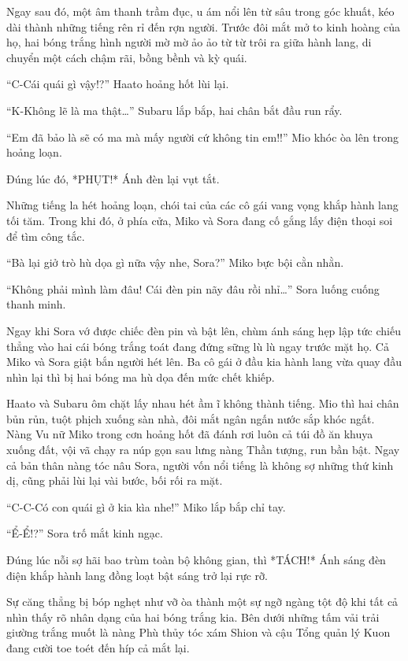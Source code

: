 \documentclass[../main.tex]{subfiles}
\begin{document}
Ngay sau đó, một âm thanh trầm đục, u ám nổi lên từ sâu trong góc khuất, kéo dài thành những tiếng rên rỉ đến rợn người. Trước đôi mắt mở to kinh hoàng của họ, hai bóng trắng hình người mờ mờ ảo ảo từ từ trôi ra giữa hành lang, di chuyển một cách chậm rãi, bồng bềnh và kỳ quái.

``C-Cái quái gì vậy!?'' Haato hoảng hốt lùi lại.

``K-Không lẽ là ma thật\dots'' Subaru lắp bắp, hai chân bắt đầu run rẩy.

``Em đã bảo là sẽ có ma mà mấy người cứ không tin em!!'' Mio khóc òa lên trong hoảng loạn.

Đúng lúc đó, *PHỤT!* Ánh đèn lại vụt tắt.

Những tiếng la hét hoảng loạn, chói tai của các cô gái vang vọng khắp hành lang tối tăm. Trong khi đó, ở phía cửa, Miko và Sora đang cố gắng lấy điện thoại soi để tìm công tắc.

``Bà lại giở trò hù dọa gì nữa vậy nhe, Sora?'' Miko bực bội cằn nhằn.

``Không phải mình làm đâu! Cái đèn pin nãy đâu rồi nhỉ\dots'' Sora luống cuống thanh minh.

Ngay khi Sora vớ được chiếc đèn pin và bật lên, chùm ánh sáng hẹp lập tức chiếu thẳng vào hai cái bóng trắng toát đang đứng sững lù lù ngay trước mặt họ. Cả Miko và Sora giật bắn người hét lên. Ba cô gái ở đầu kia hành lang vừa quay đầu nhìn lại thì bị hai bóng ma hù dọa đến mức chết khiếp.

Haato và Subaru ôm chặt lấy nhau hét ầm ĩ không thành tiếng. Mio thì hai chân bủn rủn, tuột phịch xuống sàn nhà, đôi mắt ngân ngấn nước sắp khóc ngất. Nàng Vu nữ Miko trong cơn hoảng hốt đã đánh rơi luôn cả túi đồ ăn khuya xuống đất, vội vã chạy ra núp gọn sau lưng nàng Thần tượng, run bần bật. Ngay cả bản thân nàng tóc nâu Sora, người vốn nổi tiếng là không sợ những thứ kinh dị, cũng phải lùi lại vài bước, bối rối ra mặt.

``C-C-Có con quái gì ở kia kìa nhe!'' Miko lắp bắp chỉ tay.

``Ể-Ể!?'' Sora trố mắt kinh ngạc.

Đúng lúc nỗi sợ hãi bao trùm toàn bộ không gian, thì *TÁCH!* Ánh sáng đèn điện khắp hành lang đồng loạt bật sáng trở lại rực rỡ.

Sự căng thẳng bị bóp nghẹt như vỡ òa thành một sự ngỡ ngàng tột độ khi tất cả nhìn thấy rõ nhân dạng của hai bóng trắng kia. Bên dưới những tấm vải trải giường trắng muốt là nàng Phù thủy tóc xám Shion và cậu Tổng quản lý Kuon đang cười toe toét đến híp cả mắt lại.
\end{document}
